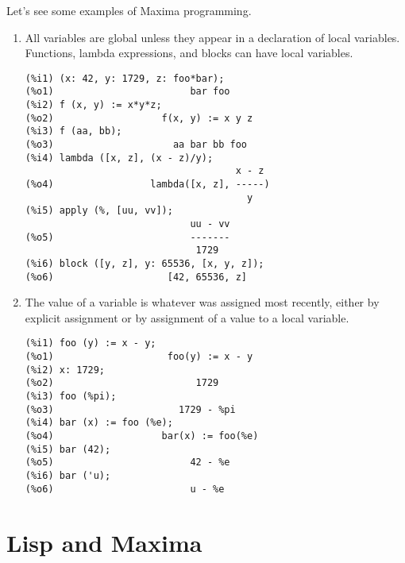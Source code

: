 \documentclass[12pt]{article}
\begin{document}
Let's see some examples of Maxima programming.

\begin{enumerate}

\item All variables are global unless they appear in a declaration of local variables.
Functions, lambda expressions, and blocks can have local variables.


\begin{verbatim}
(%i1) (x: 42, y: 1729, z: foo*bar);
(%o1)                        bar foo
(%i2) f (x, y) := x*y*z;
(%o2)                   f(x, y) := x y z
(%i3) f (aa, bb);
(%o3)                     aa bar bb foo
(%i4) lambda ([x, z], (x - z)/y);
                                     x - z
(%o4)                 lambda([x, z], -----)
                                       y
(%i5) apply (%, [uu, vv]);
                             uu - vv
(%o5)                        -------
                              1729
(%i6) block ([y, z], y: 65536, [x, y, z]);
(%o6)                    [42, 65536, z]
\end{verbatim}

\item The value of a variable is whatever was assigned most recently,
either by explicit assignment or by assignment of a value to a local variable.


\begin{verbatim}
(%i1) foo (y) := x - y;
(%o1)                    foo(y) := x - y
(%i2) x: 1729;
(%o2)                         1729
(%i3) foo (%pi);
(%o3)                      1729 - %pi
(%i4) bar (x) := foo (%e);
(%o4)                   bar(x) := foo(%e)
(%i5) bar (42);
(%o5)                        42 - %e
(%i6) bar ('u);
(%o6)                        u - %e
\end{verbatim}

\end{enumerate}

\section{Lisp and Maxima}

\end{document}
